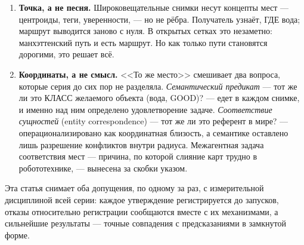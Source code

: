 \documentclass{article}
\begin{document}
\begin{enumerate}[leftmargin=20pt,itemsep=2pt,topsep=2pt]
\item \textbf{Точка, а не песня.} Широковещательные снимки несут
  концепты мест --- центроиды, теги, уверенности, --- но не рёбра.
  Получатель узнаёт, ГДЕ вода; маршрут выводится заново с нуля. В
  открытых сетках это незаметно: манхэттенский путь и есть маршрут.
  Но как только пути становятся дорогими, это решает всё.
\item \textbf{Координаты, а не смысл.} <<То же место>> смешивает два
  вопроса, которые серия до сих пор не разделяла. \emph{Семантический
  предикат} --- тот же ли это КЛАСС желаемого объекта (вода, GOOD)? ---
  едет в каждом снимке, и именно над ним определено удовлетворение
  задаче. \emph{Соответствие сущностей} (entity correspondence) --- тот
  же ли это референт в мире? --- операционализировано как координатная
  близость, а семантике оставлено лишь разрешение конфликтов внутри
  радиуса. Межагентная задача соответствия мест --- причина, по которой
  слияние карт трудно в робототехнике, --- вынесена за скобки указом.
\end{enumerate}

Эта статья снимает оба допущения, по одному за раз, с измерительной
дисциплиной всей серии: каждое утверждение регистрируется до запусков,
отказы относительно регистрации сообщаются вместе с их механизмами, а
сильнейшие результаты --- точные совпадения с предсказаниями в
замкнутой форме.
\end{document}
